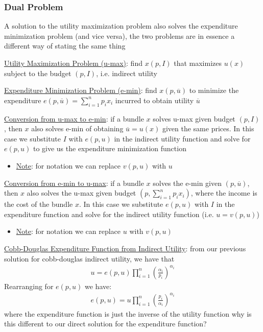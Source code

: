 \documentclass{article}
\begin{document}
\subsubsection{Dual Problem}
A solution to the utility maximization problem also solves the expenditure minimization problem (and vice versa), the two problems are in essence a different way of stating the same thing \par \vspace{0.3em}
  \underline{Utility Maximization Problem (u-max)}: find $x(p, I)$ that maximizes $u(x)$ subject to the budget $(p, I)$, i.e. indirect utility
  \par
  \underline{Expenditure Minimization Problem (e-min)}: find $x(p, \overline{u})$ to minimize the expenditure $e(p,\overline{u}) = \sum_{i=1}^{n}p_{i}x_{i}$ incurred to obtain utility $\overline{u}$
  \par
  \underline{Conversion from u-max to e-min}: if a bundle $x$ solves u-max given budget $(p, I)$, then $x$ also solves e-min of obtaining $\overline{u} = u(x)$ given the same prices. In this case we substitute $I$ with $e(p,u)$ in the indirect utility function and solve for $e(p,u)$ to give us the expenditure minimization function
  \begin{itemize}
    \item  \underline{Note}: for notation we can replace $v(p,u)$ with $u$
  \end{itemize}
  \par
  \underline{Conversion from e-min to u-max}: if a bundle $x$ solves the e-min given $(p, \overline{u})$, then $x$ also solves the u-max given budget $(p, \sum_{i=1}^{n}p_{i}x_{i})$, where the income is the cost of the bundle $x$. In this case we substitute $e(p,u)$ with $I$ in the expenditure function and solve for the indirect utility function (i.e. $u = v(p,u)$)
  \begin{itemize}
    \item  \underline{Note}: for notation we can replace $u$ with $v(p,u)$
  \end{itemize}
  \par
  \underline{Cobb-Douglas Expenditure Function from Indirect Utility}: from our previous solution for cobb-douglas indirect utility, we have that
  \begin{gather*}
    u = e(p,u) \prod_{i=1}^{n} (\frac{\alpha_{i}}{p_{i}})^{\alpha_{i}}
  \end{gather*}
  Rearranging for $e(p,u)$ we have:
  \begin{gather*}
    e(p,u) = u \prod_{i=1}^{n} (\frac{p_{i}}{\alpha_{i}})^{\alpha_{i}}
  \end{gather*}
  where the expenditure function is just the inverse of the utility function \begingroup\color{magenta} why is this different to our direct solution for the expenditure function? \endgroup
  \par
\vspace{6mm}
\end{document}
